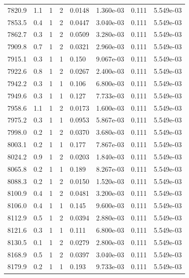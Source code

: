 \documentclass[preview]{standalone}
\begin{document}
{{{{{{{{{{{\begin{tabular}{L{1.2cm}C{1.2cm} C{0.3cm}C{0.5cm} C{1.4cm}C{1.4cm} C{1.4cm}C{1.4cm}}
  7820.9  &   1.1  & 1     &  2 &  0.0148  & 1.360e-03  & 0.111 &  5.549e-03   \\ 
  7853.5  &   0.4  & 1     &  2 &  0.0447  & 3.040e-03  & 0.111 &  5.549e-03   \\ 
  7862.7  &   0.3  & 1     &  2 &  0.0509  & 3.280e-03  & 0.111 &  5.549e-03   \\ 
  7909.8  &   0.7  & 1     &  2 &  0.0321  & 2.960e-03  & 0.111 &  5.549e-03   \\ 
  7915.1  &   0.3  & 1     &  1 &  0.150  & 9.067e-03  & 0.111 &  5.549e-03   \\ 
  7922.6  &   0.8  & 1     &  2 &  0.0267  & 2.400e-03  & 0.111 &  5.549e-03   \\ 
  7942.2  &   0.3  & 1     &  1 &  0.106  & 6.800e-03  & 0.111 &  5.549e-03   \\ 
  7949.6  &   0.3  & 1     &  1 &  0.127  & 7.733e-03  & 0.111 &  5.549e-03   \\ 
  7958.6  &   1.1  & 1     &  2 &  0.0173  & 1.600e-03  & 0.111 &  5.549e-03   \\ 
  7975.2  &   0.3  & 1     &  1 &  0.0953  & 5.867e-03  & 0.111 &  5.549e-03   \\ 
  7998.0  &   0.2  & 1     &  2 &  0.0370  & 3.680e-03  & 0.111 &  5.549e-03   \\ 
  8003.1  &   0.2  & 1     &  1 &  0.177  & 7.867e-03  & 0.111 &  5.549e-03   \\ 
  8024.2  &   0.9  & 1     &  2 &  0.0203  & 1.840e-03  & 0.111 &  5.549e-03   \\ 
  8065.8  &   0.2  & 1     &  1 &  0.189  & 8.267e-03  & 0.111 &  5.549e-03   \\ 
  8088.3  &   0.2  & 1     &  2 &  0.0150  & 1.520e-03  & 0.111 &  5.549e-03   \\ 
  8100.9  &   0.4  & 1     &  2 &  0.0481  & 3.200e-03  & 0.111 &  5.549e-03   \\ 
  8106.0  &   0.4  & 1     &  1 &  0.145  & 9.600e-03  & 0.111 &  5.549e-03   \\ 
  8112.9  &   0.5  & 1     &  2 &  0.0394  & 2.880e-03  & 0.111 &  5.549e-03   \\ 
  8121.6  &   0.3  & 1     &  1 &  0.111  & 6.800e-03  & 0.111 &  5.549e-03   \\ 
  8130.5  &   0.1  & 1     &  2 &  0.0279  & 2.800e-03  & 0.111 &  5.549e-03   \\ 
  8168.9  &   0.5  & 1     &  2 &  0.0397  & 3.040e-03  & 0.111 &  5.549e-03   \\ 
  8179.9  &   0.2  & 1     &  1 &  0.193  & 9.733e-03  & 0.111 &  5.549e-03   \\ 

\end{tabular}}}}}}}}}}}}
\end{document}
